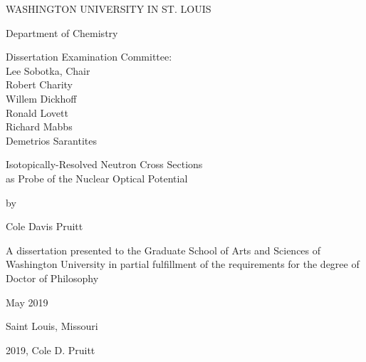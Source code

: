 \begin{titlepage}
    \begin{singlespace}
        \begin{center}
            \vspace*{1cm}

            WASHINGTON UNIVERSITY IN ST. LOUIS

            \vspace{0.5cm}
            Department of Chemistry

            \vspace{1.5cm}

            Dissertation Examination Committee:\\
            Lee Sobotka, Chair\\
            Robert Charity\\
            Willem Dickhoff\\ 
            Ronald Lovett\\
            Richard Mabbs\\
            Demetrios Sarantites\\

            \vspace{1.5 cm}

            Isotopically-Resolved Neutron Cross Sections\\
            as Probe of the Nuclear Optical Potential

            \vspace{0.5 cm}

            by

            \vspace{0.5 cm}

            Cole Davis Pruitt

            \vfill

            A dissertation presented to the Graduate School of Arts and Sciences of Washington University in partial fulfillment of the requirements for the degree of Doctor of Philosophy

            \vspace{0.8cm}

            May 2019

            \vspace{0.5 cm}
            Saint Louis, Missouri

        \end{center}
    \end{singlespace}
\end{titlepage}

\vspace*{\fill}
\begin{center}    
    \textcopyright \hspace{2pt} 2019, Cole D. Pruitt
\end{center}
\vspace*{\fill}
\thispagestyle{empty} %

\setcounter{page}{1}
